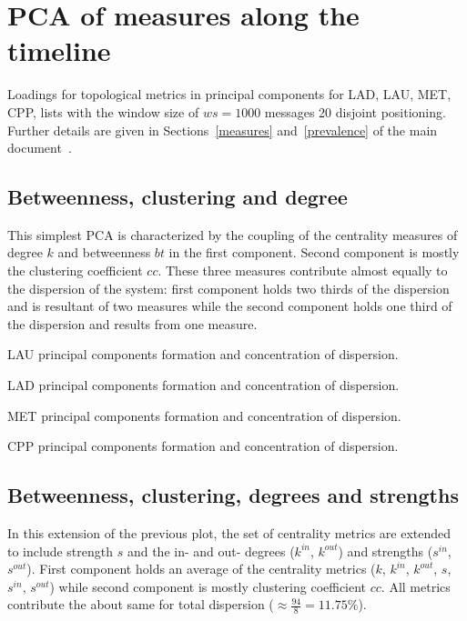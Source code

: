 \FloatBarrier
\section{PCA of measures along the timeline}\label{si:pcat}
Loadings for topological metrics in principal components for LAD, LAU, MET, CPP, lists with the window size of $ws=1000$ messages 20 disjoint positioning.
Further details are given in Sections~\ref*{measures} and~\ref*{prevalence} of the main document~\cite{tpaper}.



\subsection{Betweenness, clustering and degree}
This simplest PCA is characterized by the coupling of
the centrality measures of degree $k$ and betweenness $bt$
in the first component.
Second component is mostly the clustering coefficient $cc$.
These three measures contribute almost equally to the dispersion of the system: first component holds two thirds of the dispersion and is resultant of two measures while the second component holds one third of the dispersion and results from one measure.

\begin{table}[!h]
	\caption{LAU principal components formation and concentration of dispersion.}
	\footnotesize
	
\label{tab:pcain}
\end{table}

\begin{table}[!h]
	\caption{LAD principal components formation and concentration of dispersion.}
	\footnotesize
	
\label{tab:pcain}
\end{table}

\begin{table}[!h]
	\caption{MET principal components formation and concentration of dispersion.}
	\footnotesize
	
\label{tab:pcain}
\end{table}

\begin{table}[!h]
	\caption{CPP principal components formation and concentration of dispersion.}
	\footnotesize
	
\label{tab:pcain}
\end{table}

\FloatBarrier
\subsection{Betweenness, clustering, degrees and strengths}
In this extension of the previous plot, the set of centrality metrics are extended to include strength $s$ and the in- and out- degrees ($k^{in}$, $k^{out}$) and strengths ($s^{in}$, $s^{out}$).
First component holds an average of the centrality metrics ($k$, $k^{in}$, $k^{out}$, $s$, $s^{in}$, $s^{out}$) while
second component is mostly clustering coefficient $cc$.
All metrics contribute the about same for total dispersion
($\approx \frac{94}{8}=11.75\%$).



